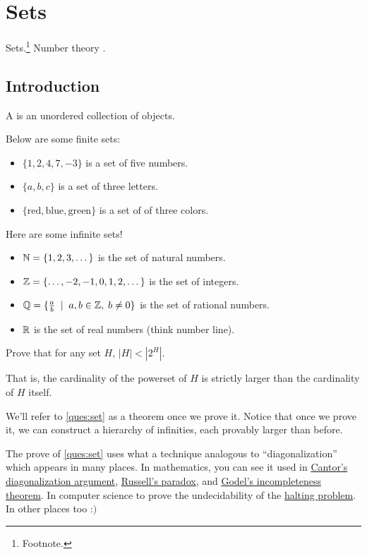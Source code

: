 \section{Sets}
\label{sets}

Sets.\footnote{Footnote.} Number theory \cite{ireland1990classical}.

\subsection{Introduction}

\begin{definition}
    A  is an unordered collection of objects.
\end{definition}

\begin{example}
    Below are some finite sets:
    \begin{itemize}
        \item $\{1, 2, 4, 7, -3\}$ is a set of five numbers.
        \item $\{a, b, c\}$ is a set of three letters.
        \item $\{\text{red}, \text{blue}, \text{green}\}$ is a set of of three colors.
    \end{itemize}
    Here are some infinite sets!
    \begin{itemize}
        \item $\mathbb N = \{1, 2, 3, \dots\}$ is the set of natural numbers.
        \item $\mathbb Z = \{\dots, -2, -1, 0, 1, 2, \dots\}$ is the set of integers.
        \item $\mathbb Q = \{\frac{a}{b} \; \mid \; a, b \in \mathbb Z, \; b \neq 0\}$ is the set of rational numbers.
        \item $\mathbb R$ is the set of real numbers (think number line).
    \end{itemize}
\end{example}

\begin{ques}
    \label{ques:set}
    Prove that for any set $H$, $|H| < |2^H|$. 
    
    That is, the cardinality of the powerset of $H$ is strictly larger than the cardinality of $H$ itself.
\end{ques}

We'll refer to \ref{ques:set} as a theorem once we prove it. Notice that once we prove it, we can construct a hierarchy of infinities, each provably larger than before.

\begin{remark}
    The prove of \ref{ques:set} uses what a technique analogous to ``diagonalization'' which appears in many places. In mathematics, you can see it used in \href{https://en.wikipedia.org/wiki/Cantor%27s_diagonal_argument}{Cantor's diagonalization argument}, \href{https://en.wikipedia.org/wiki/Russell%27s_paradox}{Russell's paradox}, and \href{https://en.wikipedia.org/wiki/G%C3%B6del%27s_incompleteness_theorems}{Godel's incompleteness theorem}. In computer science to prove the undecidability of the \href{https://en.wikipedia.org/wiki/Halting_problem}{halting problem}. In other places too :$)$
\end{remark}
